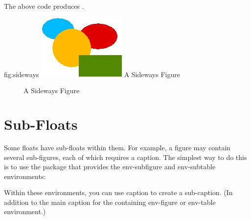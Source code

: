 \begin{code}
\begin{alltt}
\end{alltt}
\end{code}
The above code produces .

\dosidewaysfigure
 {fig:sideways}
 {\includegraphics[width=0.75\textheight]{exercises/shapes}}
 {A Sideways Figure}

\begin{htmlonly}
  \begin{figure}
    \centering
{}
    \caption{A Sideways Figure}
    \label{fig:sideways}
  \end{figure}
\end{htmlonly}

\section{Sub-Floats}
\label{sec:subfloats}

Some floats have sub-floats within them. For example, a figure may
contain several sub-figures, each of which requires a caption.
The simplest way to do this is to use the  package
that provides the \gls{env-subfigure} and \gls{env-subtable} environments:
\begin{definition}
\end{definition}
\begin{definition}
\end{definition}
Within these environments, you can use \gls{caption} to create a
sub-caption. (In addition to the main \gls{caption} for the
containing \gls{env-figure} or \gls{env-table}
environment.)

